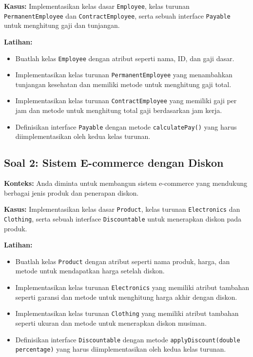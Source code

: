 \textbf{Kasus:} Implementasikan kelas dasar \texttt{Employee}, kelas turunan \texttt{PermanentEmployee} dan \texttt{ContractEmployee}, serta sebuah interface \texttt{Payable} untuk menghitung gaji dan tunjangan.

\textbf{Latihan:}
\begin{itemize}
	\item Buatlah kelas \texttt{Employee} dengan atribut seperti nama, ID, dan gaji dasar.
	\item Implementasikan kelas turunan \texttt{PermanentEmployee} yang menambahkan tunjangan kesehatan dan memiliki metode untuk menghitung gaji total.
	\item Implementasikan kelas turunan \texttt{ContractEmployee} yang memiliki gaji per jam dan metode untuk menghitung total gaji berdasarkan jam kerja.
	\item Definisikan interface \texttt{Payable} dengan metode \texttt{calculatePay()} yang harus diimplementasikan oleh kedua kelas turunan.
\end{itemize}

\subsection{Soal 2: Sistem E-commerce dengan Diskon}

\textbf{Konteks:} Anda diminta untuk membangun sistem e-commerce yang mendukung berbagai jenis produk dan penerapan diskon.

\textbf{Kasus:} Implementasikan kelas dasar \texttt{Product}, kelas turunan \texttt{Electronics} dan \texttt{Clothing}, serta sebuah interface \texttt{Discountable} untuk menerapkan diskon pada produk.

\textbf{Latihan:}
\begin{itemize}
	\item Buatlah kelas \texttt{Product} dengan atribut seperti nama produk, harga, dan metode untuk mendapatkan harga setelah diskon.
	\item Implementasikan kelas turunan \texttt{Electronics} yang memiliki atribut tambahan seperti garansi dan metode untuk menghitung harga akhir dengan diskon.
	\item Implementasikan kelas turunan \texttt{Clothing} yang memiliki atribut tambahan seperti ukuran dan metode untuk menerapkan diskon musiman.
	\item Definisikan interface \texttt{Discountable} dengan metode \texttt{applyDiscount(double percentage)} yang harus diimplementasikan oleh kedua kelas turunan.
\end{itemize}

